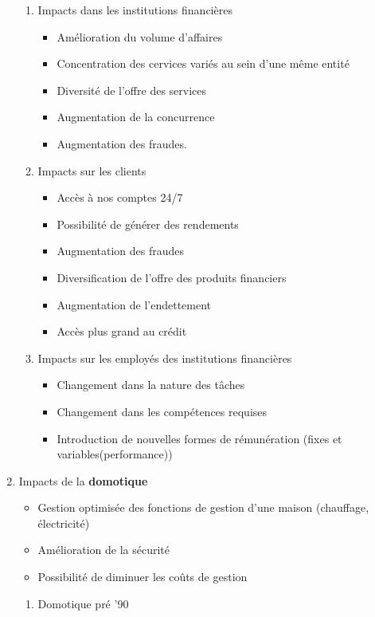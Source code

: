 \documentclass[11pt]{article}
\begin{document}
\begin{enumerate}
\begin{enumerate}
\item Impacts dans les institutions financières
\label{sec:orgd70869d}
\begin{itemize}
\item Amélioration du volume d'affaires
\item Concentration des cervices variés au sein d'une même entité
\item Diversité de l'offre des services
\item Augmentation de la concurrence
\item Augmentation des fraudes.
\end{itemize}

\item Impacts sur les clients
\label{sec:org29c2abb}
\begin{itemize}
\item Accès à nos comptes 24/7
\item Possibilité de générer des rendements
\item Augmentation des fraudes
\item Diversification de l'offre des produits financiers
\item Augmentation de l'endettement
\item Accès plus grand au crédit
\end{itemize}
\item Impacts sur les employés des institutions financières
\label{sec:org378e63b}
\begin{itemize}
\item Changement dans la nature des tâches
\item Changement dans les compétences requises
\item Introduction de nouvelles formes de rémunération (fixes et
variables(performance))
\end{itemize}
\end{enumerate}
\item Impacts de la \textbf{domotique}
\label{sec:orgf006657}
\begin{itemize}
\item Gestion optimisée des fonctions de gestion d'une maison (chauffage,
électricité)
\item Amélioration de la sécurité
\item Possibilité de diminuer les coûts de gestion
\end{itemize}
\begin{enumerate}
\item Domotique pré '90

\end{enumerate}
\end{enumerate}
\end{document}

